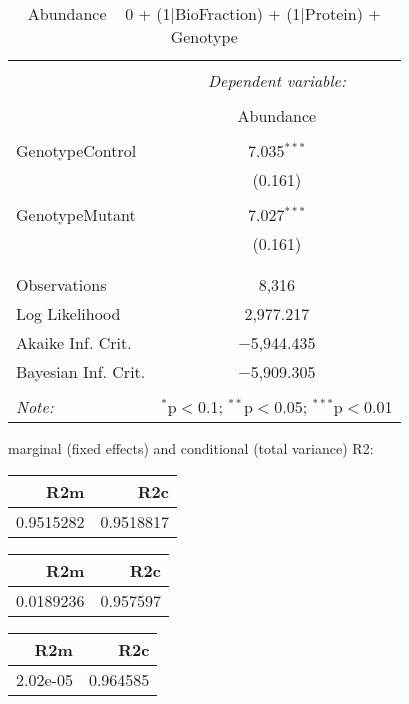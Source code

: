 \documentclass[11pt]{report}
\begin{document}
\begin{table}[!htbp] \centering 
  \caption{Abundance ~ 0 + (1|BioFraction) + (1|Protein) + Genotype} 
  \label{} 
\begin{tabular}{@{\extracolsep{5pt}}lc} 
\\[-1.8ex]\hline 
\hline \\[-1.8ex] 
 & \multicolumn{1}{c}{\textit{Dependent variable:}} \\ 
\cline{2-2} 
\\[-1.8ex] & Abundance \\ 
\hline \\[-1.8ex] 
 GenotypeControl & 7.035$^{***}$ \\ 
  & (0.161) \\ 
  & \\ 
 GenotypeMutant & 7.027$^{***}$ \\ 
  & (0.161) \\ 
  & \\ 
\hline \\[-1.8ex] 
Observations & 8,316 \\ 
Log Likelihood & 2,977.217 \\ 
Akaike Inf. Crit. & $-$5,944.435 \\ 
Bayesian Inf. Crit. & $-$5,909.305 \\ 
\hline 
\hline \\[-1.8ex] 
\textit{Note:}  & \multicolumn{1}{r}{$^{*}$p$<$0.1; $^{**}$p$<$0.05; $^{***}$p$<$0.01} \\ 
\end{tabular} 
\end{table} 
marginal (fixed effects) and conditional (total variance) R2:

\begin{tabular}{r|r}
\hline
R2m & R2c\\
\hline
0.9515282 & 0.9518817\\
\hline
\end{tabular}

\begin{tabular}{r|r}
\hline
R2m & R2c\\
\hline
0.0189236 & 0.957597\\
\hline
\end{tabular}

\begin{tabular}{r|r}
\hline
R2m & R2c\\
\hline
2.02e-05 & 0.964585\\
\hline
\end{tabular}
\end{document}
